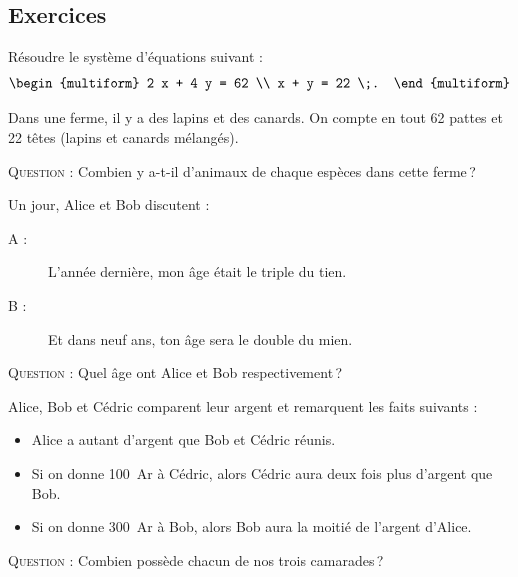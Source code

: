 \TCDLessonStyleOff
\clearpage
\newpage
\subsection{Exercices}
      \begin{exo}\label{exo:syslin-1}
            R\'esoudre le syst\`eme d'\'equations suivant :
            \[
                  \begin{multiform}
                        2 x + 4 y = 62 \\
                          x +   y = 22 \;.
                  \end{multiform}
            \]
      \end{exo}
      \begin{exo}\label{exo:syslin-2}
            Dans une ferme, il y a des lapins et des canards.
            On compte en tout 62 pattes et 22 t\^etes (lapins et canards m\'elang\'es).
            
            \textsc{Question :} Combien y a-t-il d'animaux de chaque esp\`eces dans cette ferme\,?
      \end{exo}
      \begin{exo}\label{exo:syslin-3}
            Un jour, Alice et Bob discutent :
            \begin{description}
                  \item[A : ] L'ann\'ee derni\`ere, mon \^age \'etait le triple du tien.
                  \item[B : ] Et dans neuf ans, ton \^age sera le double du mien.
            \end{description}
            \textsc{Question :} Quel \^age ont Alice et Bob respectivement\,?
      \end{exo}
      \begin{exo}\label{exo:syslin-4}
            \label{exo:mise en equation systeme lineaire a 3 inconnues}
            Alice, Bob et C\'edric comparent leur argent et remarquent les faits suivants :
            \begin{itemize}
                  \item Alice a autant d'argent que Bob et C\'edric r\'eunis.
                  \item Si on donne 100~Ar \`a C\'edric, alors C\'edric aura deux fois plus d'argent que Bob.
                  \item Si on donne 300~Ar \`a Bob, alors Bob aura la moiti\'e de l'argent d'Alice.
            \end{itemize}
            \textsc{Question :} Combien poss\`ede chacun de nos trois camarades\,?
      \end{exo}
